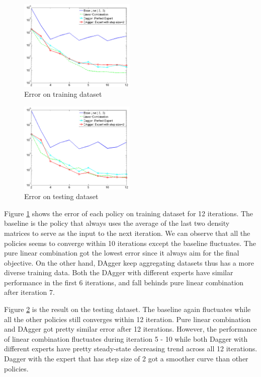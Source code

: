 \documentclass[twoside]{article}
\begin{document}
\begin{figure}[h!]
  \caption{Error on training dataset}
	\label{fig:training}
    \includegraphics[width=210px]{Dagger_beta05_training.jpg}
\end{figure}

\begin{figure}[h!]

  \caption{Error on testing dataset}
  \label{fig:testing}
    \includegraphics[width=210px]{Dagger_beta05_testing.jpg}
\end{figure}

Figure \ref{fig:training} shows the error of each policy on training dataset for 12 iterations. The baseline is the policy that always uses the average of the last two density matrices to serve as the input to the next iteration.  We can observe that all the policies seems to  converge within 10 iterations except the baseline fluctuates. The pure linear combination got the lowest error since it always aim for the final objective. On the other hand, DAgger keep aggregating datasets thus has a more diverse training data. Both the DAgger with different experts have similar performance in the first 6 iterations, and fall behinds pure linear combination after iteration 7. 

Figure \ref{fig:testing} is the result  on the testing dataset.
The baseline again fluctuates while all the other policies still converges within 12 iteration. 
Pure linear combination and DAgger got pretty similar error after 12 iterations. However, the performance of linear combination fluctuates during iteration 5 - 10 while both Dagger with different experts have pretty steady-state decreasing trend across all 12 iterations. Dagger with the expert that has step size of 2 got a smoother curve than other policies.
\end{document}
